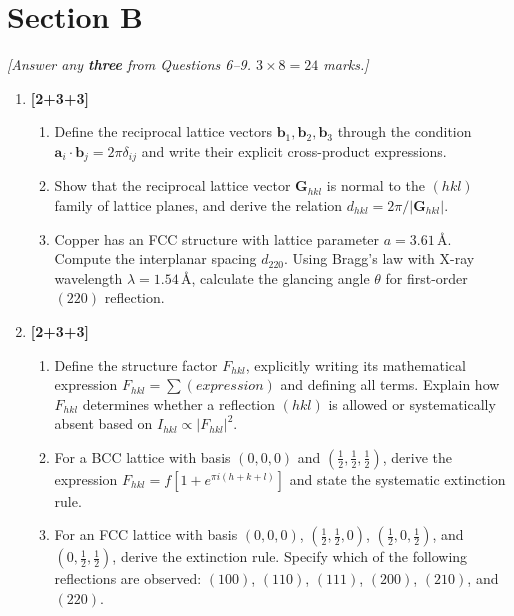 \documentclass[11pt,a4paper]{article}
\begin{document}
\section*{Section B}
\noindent\textit{[Answer any \textbf{three} from Questions 6--9. $3 \times 8 = 24$ marks.]}
\vspace{4pt}

\begin{enumerate}[leftmargin=*,itemsep=12pt,resume=questions]

\item \hfill\textbf{[2+3+3]}
\begin{enumerate}[label=(\alph*),itemsep=4pt]
    \item Define the reciprocal lattice vectors $\mathbf{b}_{1},\mathbf{b}_{2},\mathbf{b}_{3}$ through the condition $\mathbf{a}_{i}\cdot\mathbf{b}_{j}=2\pi\delta_{ij}$ and write their explicit cross-product expressions.
    \item Show that the reciprocal lattice vector $\mathbf{G}_{hkl}$ is normal to the $(hkl)$ family of lattice planes, and derive the relation $d_{hkl}=2\pi/\lvert\mathbf{G}_{hkl}\rvert$.
    \item Copper has an FCC structure with lattice parameter $a=3.61\,\text{\AA}$. Compute the interplanar spacing $d_{220}$. Using Bragg's law with X-ray wavelength $\lambda=1.54\,\text{\AA}$, calculate the glancing angle $\theta$ for first-order $(220)$ reflection.
\end{enumerate}

\item \hfill\textbf{[2+3+3]}
\begin{enumerate}[label=(\alph*),itemsep=4pt]
    \item Define the structure factor $F_{hkl}$, explicitly writing its mathematical expression $F_{hkl}=\sum(expression)$ and defining all terms. Explain how $F_{hkl}$ determines whether a reflection $(hkl)$ is allowed or systematically absent based on $I_{hkl}\propto\lvert F_{hkl}\rvert^{2}$.
    \item For a BCC lattice with basis $(0,0,0)$ and $(\tfrac12,\tfrac12,\tfrac12)$, derive the expression $F_{hkl}=f[1+e^{\pi i(h+k+l)}]$ and state the systematic extinction rule.
    \item For an FCC lattice with basis $(0,0,0)$, $(\tfrac12,\tfrac12,0)$, $(\tfrac12,0,\tfrac12)$, and $(0,\tfrac12,\tfrac12)$, derive the extinction rule. Specify which of the following reflections are observed: $(100)$, $(110)$, $(111)$, $(200)$, $(210)$, and $(220)$.
\end{enumerate}


\end{enumerate}
\end{document}

